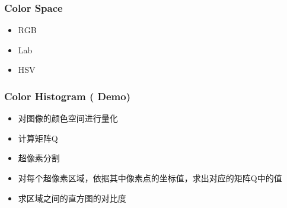 \documentclass[notheorems,serif,table,compress]{beamer}  %
\begin{document}
\begin{frame}
\frametitle{Color Space}
\begin{itemize}
\item RGB
\item Lab
\item HSV
\end{itemize}
\end{frame}


\begin{frame}
\frametitle{Color Histogram (\color{yellow} \textbf{Demo})}
\begin{itemize}
\item 对图像的颜色空间进行量化
\item 计算矩阵Q
\item 超像素分割
\item 对每个超像素区域，依据其中像素点的坐标值，求出对应的矩阵Q中的值
\item 求区域之间的直方图的对比度
\end{itemize}
\end{frame}
\end{document}
